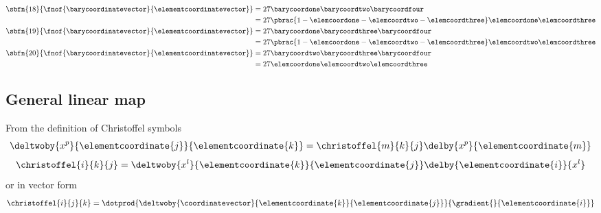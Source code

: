 \begin{equation}
\begin{aligned}
  \sbfn{18}{\fnof{\barycoordinatevector}{\elementcoordinatevector}}&=27\barycoordone\barycoordtwo\barycoordfour\\
  &=27\pbrac{1-\elemcoordone-\elemcoordtwo-\elemcoordthree}\elemcoordone\elemcoordthree\\
  \sbfn{19}{\fnof{\barycoordinatevector}{\elementcoordinatevector}}&=27\barycoordone\barycoordthree\barycoordfour\\
  &=27\pbrac{1-\elemcoordone-\elemcoordtwo-\elemcoordthree}\elemcoordtwo\elemcoordthree\\
  \sbfn{20}{\fnof{\barycoordinatevector}{\elementcoordinatevector}}&=27\barycoordtwo\barycoordthree\barycoordfour\\
  &=27\elemcoordone\elemcoordtwo\elemcoordthree
\end{aligned}
\label{eqn:ThreeDCubicSimplexBasisFunctions2}
\end{equation}
\normalsize

\subsection{General linear map}

From the definition of Christoffel symbols
\begin{equation}
  \deltwoby{x^{p}}{\elementcoordinate{j}}{\elementcoordinate{k}}=\christoffel{m}{k}{j}\delby{x^{p}}{\elementcoordinate{m}}
\end{equation}
\ie
\begin{equation}
  \christoffel{i}{k}{j}=\deltwoby{x^{l}}{\elementcoordinate{k}}{\elementcoordinate{j}}\delby{\elementcoordinate{i}}{x^{l}}
\end{equation}
or in vector form
\begin{equation}
  \christoffel{i}{j}{k}=\dotprod{\deltwoby{\coordinatevector}{\elementcoordinate{k}}{\elementcoordinate{j}}}{\gradient{}{\elementcoordinate{i}}}
\end{equation}

